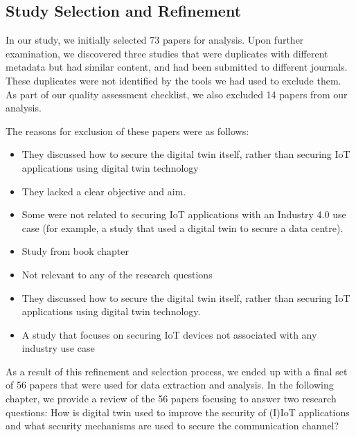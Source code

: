 \subsection{Study Selection and Refinement}

In our study, we initially selected 73 papers for analysis. Upon further examination, we discovered three studies that were duplicates with different metadata but had similar content, and had been submitted to different journals. These duplicates were not identified by the tools we had used to exclude them. As part of our quality assessment checklist, we also excluded 14 papers from our analysis.

The reasons for exclusion of these papers were as follows:

\begin{itemize}
    \item They discussed how to secure the digital twin itself, rather than securing IoT applications using digital twin technology
    \item They lacked a clear objective and aim.
    \item Some were not related to securing IoT applications with an Industry 4.0 use case (for example, a study that used a digital twin to secure a data centre).
    \item Study from book chapter 
    \item Not relevant to any of the research questions 
    \item They discussed how to secure the digital twin itself, rather than securing IoT applications using digital twin technology.
    \item A study that focuses on securing IoT devices not associated with any industry use case 
\end{itemize}

As a result of this refinement and selection process, we ended up with a final set of 56 papers that were used for data extraction and analysis. In the following chapter, we provide a review of the 56 papers focusing to answer two research questions: How is digital twin used to improve the security of (I)IoT applications and what security mechanisms are used to secure the communication channel?    



